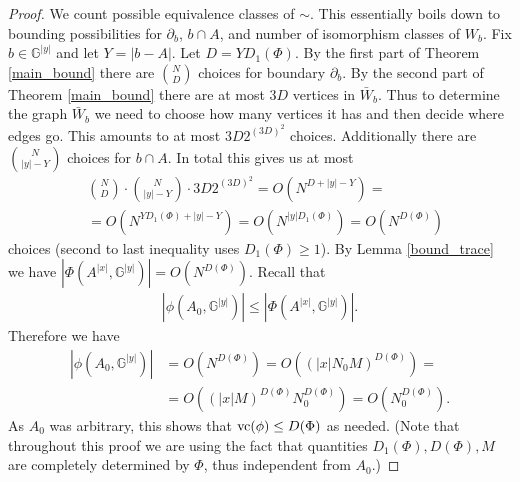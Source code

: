 \documentclass{amsart}
\newcommand{\GG}{\mathbb G}
\newcommand{\GGY}{\GG^{|y|}}
\newcommand{\AX}{A^{|x|}}
\newcommand{\paren}[1]{\left(#1\right)}
\newcommand{\abs}[1]{\left|#1\right|}
\begin{document}
\begin{proof}
  We count possible equivalence classes of $\sim$.
  This essentially boils down to bounding possibilities for $\partial_b$, $b \cap A$, and number of isomorphism classes of $W_b$.
  Fix $b \in \GGY$ and let $Y = \abs{b - A}$.
  Let $D = Y D_1(\Phi)$.
  By the first part of Theorem \ref{main_bound} there are $N \choose D$ choices for boundary $\partial_b$.
  By the second part of Theorem \ref{main_bound} there are at most $3D$ vertices in $\bar W_b$.
  Thus to determine the graph $\bar W_b$ we need to choose how many vertices it has and then decide where edges go.
  This amounts to at most $3D 2^{(3D)^2}$ choices.
  Additionally there are $N \choose |y| - Y$ choices for $b \cap A$.
  In total this gives us at most
  \begin{align*}
    &{N \choose D} \cdot {N \choose |y| - Y} \cdot 3D 2^{(3D)^2} = O(N^{D + |y| - Y}) = \\
    &= O(N^{Y D_1(\Phi) + |y| - Y}) = O(N^{|y| D_1(\Phi)}) = O(N^{D(\Phi)})
  \end{align*}
  choices (second to last inequality uses $D_1(\Phi) \geq 1$).
  By Lemma \ref{bound_trace} we have $\abs{\Phi(\AX, \GGY)} = O(N^{D(\Phi)})$.
  Recall that 
  \begin{align*}
    \abs{\phi(A_0, \GGY)} \leq \abs{\Phi(\AX, \GGY)}.    
  \end{align*}
  Therefore we have
  \begin{align*}
    \abs{\phi(A_0, \GGY)} &= O(N^{D(\Phi)}) = O(\paren{|x| N_0 M}^{D(\Phi)}) = \\
    &= O(\paren{|x| M}^{D(\Phi)} N_0^{D(\Phi)}) = O(N_0^{D(\Phi)}).
  \end{align*}
  As $A_0$ was arbitrary, this shows that $\operatorname{vc}(\phi) \leq D(\Phi)$ as needed.
  (Note that throughout this proof we are using the fact that quantities $D_1(\Phi), D(\Phi), M$ are completely determined by $\Phi$,
  thus independent from $A_0$.)
\end{proof}
\end{document}
